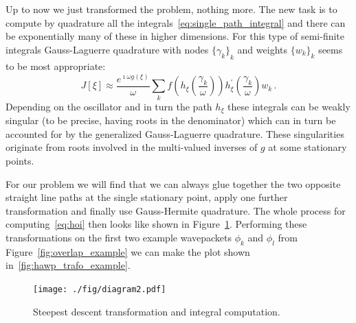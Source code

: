 \documentclass[a4paper,10pt]{article}
\begin{document}
Up to now we just transformed the problem, nothing more. The new task is to
compute by quadrature all the integrals~\eqref{eq:single_path_integral} and
there can be exponentially many of these in higher dimensions. For this type of
semi-finite integrals Gauss-Laguerre quadrature with nodes ${\{\gamma_k\}}_{k}$
and weights ${\{w_k\}}_{k}$ seems to be most appropriate:
\begin{equation}
  J[\xi] \approx \frac{e^{\imath \omega g(\xi)}}{\omega}
                 \sum_{k}
                   f\left(h_{\xi}\left(\frac{\gamma_k}{\omega}\right)\right)
                   h_{\xi}^{\prime}\left(\frac{\gamma_k}{\omega}\right)
                   w_k \,.
\end{equation}
Depending on the oscillator and in turn the path $h_{\xi}$ these integrals can be
weakly singular (to be precise, having roots in the denominator) which can in turn
be accounted for by the generalized Gauss-Laguerre quadrature. These singularities
originate from roots involved in the multi-valued inverses of $g$ at some stationary
points.

For our problem we will find that we can always glue together the two opposite
straight line paths at the single stationary point, apply one further transformation and
finally use Gauss-Hermite quadrature. The whole process for computing~\eqref{eq:hoi}
then looks like shown in Figure~\ref{fig:transformation_chain_2}. Performing these
transformations on the first two example wavepackets $\phi_k$ and $\phi_l$ from
Figure~\ref{fig:overlap_example} we can make the plot shown in~\ref{fig:hawp_trafo_example}.

\begin{figure}
  \centering
  \texttt{[image: ./fig/diagram2.pdf]}
  \caption{Steepest descent transformation and integral computation.}
  \label{fig:transformation_chain_2}
\end{figure}
\end{document}
